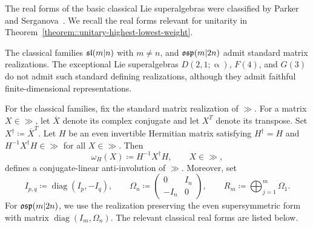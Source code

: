 The real forms of the basic classical Lie superalgebras were classified by Parker~\cite{ParkerRealForms} and Serganova~\cite{serganova1983classification}. We recall the real forms relevant for unitarity in Theorem~\ref{theorem::unitary-highest-lowest-weight}. 

The classical families $\sl(m\vert n)$ with $m\neq n$, and $\osp(m\vert 2n)$ admit standard matrix realizations. The exceptional Lie superalgebras $D(2,1;\upalpha)$, $F(4)$, and $G(3)$ do not admit such standard defining realizations, although they admit faithful finite-dimensional representations.

For the classical families, fix the standard matrix realization of $\gg$. For a matrix $X \in \gg$, let $\overline{X}$ denote its complex conjugate and let $X^T$ denote its transpose. Set
$
X^\dagger\coloneqq\overline{X}^T.
$
Let $H$ be an even invertible Hermitian matrix satisfying $H^\dagger=H$ and
$
H^{-1}X^\dagger H\in\gg
$
for all $X\in\gg$. Then
\begin{equation}
\omega_H(X)\coloneqq H^{-1}X^\dagger H,
\qquad X\in\gg,
\end{equation}
defines a conjugate-linear anti-involution of $\gg$. Moreover, set
\begin{equation}
    I_{p,q}\coloneqq\operatorname{diag}(I_p,-I_q),
    \qquad
    \Omega_n\coloneqq
    \begin{pmatrix}0&I_n\\-I_n&0\end{pmatrix},
    \qquad
    R_m\coloneqq\bigoplus_{j=1}^{m}\Omega_1.
\end{equation}
For $\osp(m\vert2n)$, we use the realization preserving the even supersymmetric form with matrix $\operatorname{diag}(I_m,\Omega_n)$. The relevant classical real forms are listed below.

